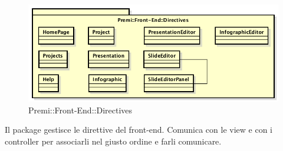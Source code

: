 \begin{figure}[h]
	\centering
	\includegraphics[width=0.7\linewidth]{img/premi_front_end_directives}
	\caption[Premi::Front-End::Directives]{Premi::Front-End::Directives}
\end{figure}
Il package gestisce le direttive del front-end. Comunica con le view e con i controller per associarli nel giusto ordine e farli comunicare.